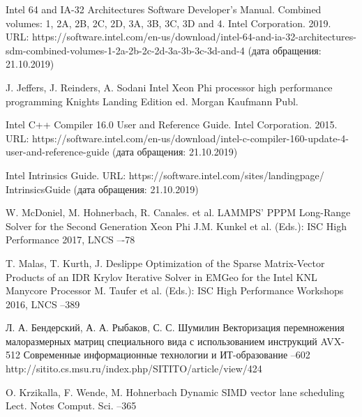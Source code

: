 \documentclass[utf8]{psta}
\begin{document}
\begin{thebibliography}{30}


\by
Intel 64 and IA-32 Architectures Software Developer's Manual. Combined volumes: 1, 2A, 2B, 2C, 2D, 3A, 3B, 3C, 3D and 4. Intel Corporation. 2019. URL: https://software.intel.com/en-us/download/intel-64-and-ia-32-architectures-sdm-combined-volumes-1-2a-2b-2c-2d-3a-3b-3c-3d-and-4 (дата обращения: 21.10.2019)

\by J. Jeffers, J. Reinders, A. Sodani 
\book Intel Xeon Phi processor high performance programming
\bookinfo Knights Landing Edition
 ed.
\publ Morgan Kaufmann Publ.

\by
Intel C++ Compiler 16.0 User and Reference Guide. Intel Corporation. 2015. URL: https://software.intel.com/en-us/download/intel-c-compiler-160-update-4-user-and-reference-guide (дата обращения: 21.10.2019)

\by
Intel Intrinsics Guide. URL: https://software.intel.com/sites/landingpage/ IntrinsicsGuide (дата обращения: 21.10.2019)


\by W. McDoniel, M. Hohnerbach, R. Canales. et al.
\paper LAMMPS' PPPM Long-Range Solver for the Second Generation Xeon Phi
\jour J.M. Kunkel et al. (Eds.): ISC High Performance 2017, LNCS
–-78

\by T. Malas, T. Kurth, J. Deslippe
\paper Optimization of the Sparse Matrix-Vector Products of an IDR Krylov Iterative Solver in EMGeo for the Intel KNL Manycore Processor
\jour M. Taufer et al. (Eds.): ISC High Performance Workshops 2016, LNCS
--389

\by Л. А. Бендерский, А. А. Рыбаков, С. С. Шумилин
\paper Векторизация перемножения малоразмерных матриц специального вида с использованием инструкций AVX-512
\jour Современные информационные технологии и ИТ-образование
--602
\URL http://sitito.cs.msu.ru/index.php/SITITO/article/view/424

\by O. Krzikalla, F. Wende, M. Hohnerbach
\paper Dynamic SIMD vector lane scheduling
\jour Lect. Notes Comput. Sci.
--365


\end{thebibliography}
\end{document}
